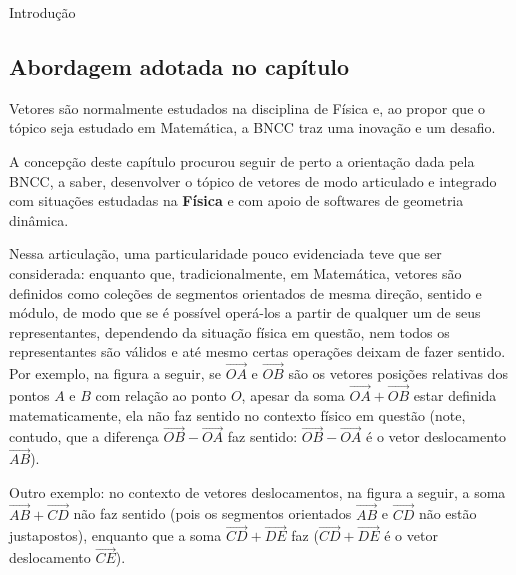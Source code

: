 \begin{apresentacao}{Introdução}
\subsection{Abordagem adotada no capítulo}

Vetores são normalmente estudados na disciplina de Física e, ao propor que o tópico seja estudado em Matemática, a BNCC traz uma inovação e um desafio.

A concepção deste capítulo procurou seguir de perto a orientação dada pela BNCC, a saber, desenvolver o tópico de vetores de modo articulado e integrado com situações estudadas na \textbf{Física} e com apoio de softwares de geometria dinâmica.

Nessa articulação, uma particularidade pouco evidenciada teve que ser considerada: enquanto que, tradicionalmente, em Matemática, vetores são definidos como coleções de segmentos orientados de mesma direção, sentido e módulo, de modo que se é possível operá-los a partir de qualquer um de seus representantes, dependendo da situação física em questão, nem todos os representantes são válidos e até mesmo certas operações deixam de fazer sentido. Por exemplo, na figura a seguir, se \(\overrightarrow{OA}\) e \(\overrightarrow{OB}\) são os vetores posições relativas dos pontos \(A\) e \(B\) com relação ao ponto \(O\),
apesar da soma \(\overrightarrow{OA} + \overrightarrow{OB}\) estar definida matematicamente, ela não faz sentido no contexto físico em questão (note, contudo, que a diferença \(\overrightarrow{OB} - \overrightarrow{OA}\) faz sentido: \(\overrightarrow{OB} - \overrightarrow{OA}\) é o vetor deslocamento \(\overrightarrow{AB}\)).

\begin{center}
\end{center}

Outro exemplo: no contexto de vetores deslocamentos, na figura a seguir, a soma \(\overrightarrow{AB} + \overrightarrow{CD}\) não faz sentido (pois os segmentos orientados \(\overrightarrow{AB}\) e \(\overrightarrow{CD}\) não estão justapostos), enquanto que a soma \(\overrightarrow{CD} + \overrightarrow{DE}\) faz (\(\overrightarrow{CD} + \overrightarrow{DE}\) é o vetor deslocamento \(\overrightarrow{CE}\)).


\end{apresentacao}
